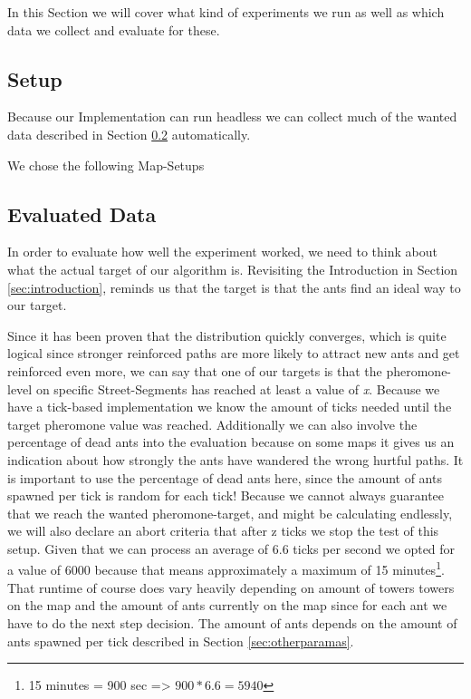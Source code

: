 
In this Section we will cover what kind of experiments we run as well as which data we collect and evaluate for these.

\subsection{Setup}

Because our Implementation can run headless we can collect much of the wanted data described in Section \ref{sec:experimentevdata} automatically. 

We chose the following Map-Setups 

\subsection{Evaluated Data}
\label{sec:experimentevdata}

In order to evaluate how well the experiment worked, we need to think about what the actual target of our algorithm is. Revisiting the Introduction in Section \ref{sec:introduction}, reminds us that the target is that the ants find an ideal way to our target.

Since it has been proven that the distribution quickly converges\cite[P. 15]{maniezzo2002ant}, which is quite logical since stronger reinforced paths are more likely to attract new ants and get reinforced even more, we can say that one of our targets is that the pheromone-level on specific Street-Segments has reached at least a value of \textit{x}.
Because we have a tick-based implementation we know the amount of ticks needed until the target pheromone value was reached. Additionally we can also involve the percentage of dead ants into the evaluation because on some maps it gives us an indication about how strongly the ants have wandered  the wrong hurtful paths. It is important to use the percentage of dead ants here, since the amount of ants spawned per tick is random for each tick!
Because we cannot always guarantee that we reach the wanted pheromone-target, and might be calculating endlessly, we will also declare an abort criteria that after z ticks we stop the test of this setup. Given that we can process an average of 6.6 ticks per second we opted for a value of 6000 because that means approximately a maximum of 15 minutes\footnote{15 minutes = 900 sec => $900 * 6.6 = 5940$}. That runtime of course does vary heavily depending on amount of towers towers on the map and the amount of ants currently on the map since for each ant we have to do the next step decision. The amount of ants depends on the amount of ants spawned per tick described in Section \ref{sec:otherparamas}.


